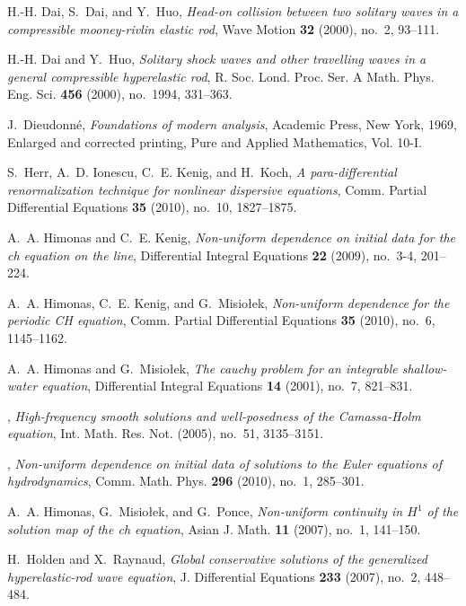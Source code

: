 \documentclass[12pt,oneside,reqno]{amsbook}
\numberwithin{equation}{section}
\begin{document}
\begin{thebibliography}{100}
H.-H. Dai, S.~Dai, and Y.~Huo, \emph{Head-on collision between two solitary
  waves in a compressible mooney-rivlin elastic rod}, Wave Motion \textbf{32}
  (2000), no.~2, 93--111.

H.-H. Dai and Y.~Huo, \emph{Solitary shock waves and other travelling waves in
  a general compressible hyperelastic rod}, R. Soc. Lond. Proc. Ser. A Math.
  Phys. Eng. Sci. \textbf{456} (2000), no.~1994, 331--363.

J.~Dieudonn{{\'e}}, \emph{Foundations of modern analysis}, Academic Press, New
  York, 1969, Enlarged and corrected printing, Pure and Applied Mathematics,
  Vol. 10-I. 

S.~Herr, A.~D. Ionescu, C.~E. Kenig, and H.~Koch, \emph{A para-differential
  renormalization technique for nonlinear dispersive equations}, Comm. Partial
  Differential Equations \textbf{35} (2010), no.~10, 1827--1875.

A.~A. Himonas and C.~E. Kenig, \emph{Non-uniform dependence on initial data for
  the ch equation on the line}, Differential Integral Equations \textbf{22}
  (2009), no.~3-4, 201--224.

A.~A. Himonas, C.~E. Kenig, and G.~Misio{\l}ek, \emph{Non-uniform dependence
  for the periodic {CH} equation}, Comm. Partial Differential Equations
  \textbf{35} (2010), no.~6, 1145--1162. 

A.~A. Himonas and G.~Misio{\l}ek, \emph{The cauchy problem for an integrable
  shallow-water equation}, Differential Integral Equations \textbf{14} (2001),
  no.~7, 821--831.

\bysame, \emph{High-frequency smooth solutions and
  well-posedness of the {C}amassa-{H}olm equation}, Int. Math. Res. Not.
  (2005), no.~51, 3135--3151. 

\bysame, \emph{Non-uniform dependence on initial data
  of solutions to the {E}uler equations of hydrodynamics}, Comm. Math. Phys.
  \textbf{296} (2010), no.~1, 285--301. 

A.~A. Himonas, G.~Misio{\l}ek, and G.~Ponce, \emph{Non-uniform continuity in
  $H^ 1$ of the solution map of the ch equation}, Asian J. Math.
  \textbf{11} (2007), no.~1, 141--150.

H.~Holden and X.~Raynaud, \emph{Global conservative solutions of the
  generalized hyperelastic-rod wave equation}, J. Differential Equations
  \textbf{233} (2007), no.~2, 448--484.


\end{thebibliography}
\end{document}
